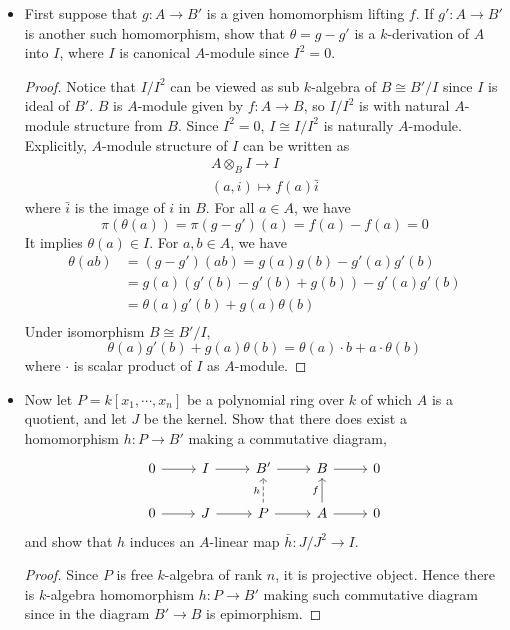 \documentclass[a4paper,12pt]{amsart}
\theoremstyle{definition}
\theoremstyle{plain}
\begin{document}
	\begin{itemize}
		\item  First suppose that $g: A \to B'$ is a given homomorphism lifting $f$. If $g' \colon A \to B'$  is another such homomorphism, show that $\theta = g-g'$ is a $k$-derivation of $A$ into $I$, where $I$ is canonical $A$-module since $I^2 =0$.
		\begin{proof}
			Notice that $I/I^2$ can be viewed as sub $k$-algebra of $B \cong B'/I$ since $I$ is ideal of $B'$. $B$ is $A$-module given by $f \colon A \to B$, so $I/I^2$ is with natural $A$-module structure from $B$. Since $I^2 =0$, $I \cong I/I^2$ is naturally $A$-module. Explicitly, $A$-module structure of $I$ can be written as\[
			\begin{aligned}
			A \otimes_B I \to I \\
			(a,i) \mapsto f(a) \bar{i}
			\end{aligned}
			\]
			where $\bar{i}$ is the image of $i$ in $B$.
			For all $a \in A$, we have \[
			\pi(\theta(a)) = \pi(g-g')(a) = f(a)- f(a) =0
			\]
			It implies $\theta(a) \in I$. For $a, b \in A$, we have 
			\[
			\begin{aligned}
			\theta(ab) &= (g-g')(ab)= g(a)g(b) - g'(a)g'(b)\\
			& =g(a)(g'(b)- g'(b) + g(b)) - g'(a)g'(b)\\
			& =\theta(a)g'(b)+ g(a)\theta(b)\\
			\end{aligned}
			\]
			Under isomorphism $B \cong B'/I$, 
			\[
			\theta(a)g'(b) + g(a)\theta(b) = \theta(a) \cdot b + a \cdot \theta(b)
			\]
			where $\cdot$ is scalar product of $I$ as $A$-module.
		\end{proof}
	\item Now let $P= k[x_1, \cdots, x_n]$ be a polynomial ring over $k$ of which $A$ is a quotient, and let $J$ be the kernel. Show that there does exist a homomorphism $h \colon P \to B'$ making a commutative diagram,
	\[
	\begin{tikzcd}
	0 \ar[r]& I \ar[r] & B' \ar[r] & B \ar[r] & 0\\
	0 \ar[r] & J \ar[r] & P \ar[r] \ar[u,"h",dashed] & A\ar[u,"f"] \ar[r] & 0
	\end{tikzcd}
	\]
	and show that $h$ induces an $A$-linear map $\bar{h} \colon J/J^2 \to I$.
	\begin{proof}
		Since $P$ is free $k$-algebra of rank $n$, it is projective object. Hence there is $k$-algebra homomorphism $h \colon P \to B'$ making such commutative diagram since in the diagram $B' \to B$ is epimorphism.

\end{proof}
\end{itemize}
\end{document}
